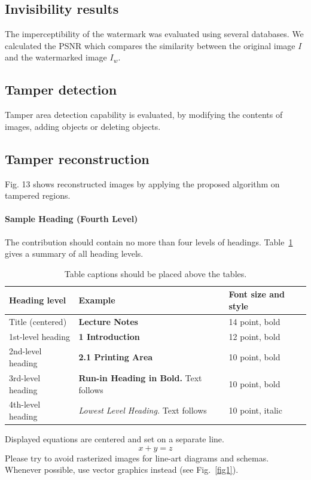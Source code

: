 \documentclass[runningheads]{llncs}
\begin{document}
\subsection{Invisibility results}
The imperceptibility of the watermark was evaluated using several databases. We calculated the PSNR which compares the similarity between the original image $ I $ and the watermarked image $ I_w $.

\subsection{Tamper detection}
Tamper area detection capability is evaluated, by modifying the contents of images, adding objects or deleting objects.

\subsection{Tamper reconstruction}
Fig. 13 shows reconstructed images by applying the proposed algorithm on tampered regions.

\paragraph{Sample Heading (Fourth Level)}
The contribution should contain no more than four levels of
headings. Table~\ref{tab1} gives a summary of all heading levels.

\begin{table}
\caption{Table captions should be placed above the
tables.}\label{tab1}
\begin{tabular}{|l|l|l|}
\hline
Heading level &  Example & Font size and style\\
\hline
Title (centered) &  {\Large\bfseries Lecture Notes} & 14 point, bold\\
1st-level heading &  {\large\bfseries 1 Introduction} & 12 point, bold\\
2nd-level heading & {\bfseries 2.1 Printing Area} & 10 point, bold\\
3rd-level heading & {\bfseries Run-in Heading in Bold.} Text follows & 10 point, bold\\
4th-level heading & {\itshape Lowest Level Heading.} Text follows & 10 point, italic\\
\hline
\end{tabular}
\end{table}


\noindent Displayed equations are centered and set on a separate
line.
\begin{equation}
x + y = z
\end{equation}
Please try to avoid rasterized images for line-art diagrams and
schemas. Whenever possible, use vector graphics instead (see
Fig.~\ref{fig1}).
\end{document}
